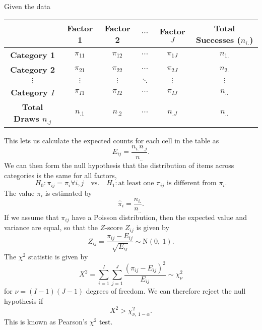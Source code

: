 \documentclass{article}
\begin{document}
Given the data
\begin{table}[H]
    \centering
    \begin{tabular}{c c c c c c}
        \toprule
                                        & \textbf{Factor 1} & \textbf{Factor 2} & \(\cdots\) & \textbf{Factor \(J\)} & \textbf{Total Successes (\(n_{i.}\))} \\
        \midrule
        \textbf{Category 1}             & \(\pi_{11}\)      & \(\pi_{12}\)      & \(\cdots\) & \(\pi_{1J}\)          & \(n_{1.}\)                            \\
        \textbf{Category 2}             & \(\pi_{21}\)      & \(\pi_{22}\)      & \(\cdots\) & \(\pi_{2J}\)          & \(n_{2.}\)                            \\
        \(\vdots\)                      & \(\vdots\)        & \(\vdots\)        & \(\ddots\) & \(\vdots\)            & \(\vdots\)                            \\
        \textbf{Category \(I\)}         & \(\pi_{I1}\)      & \(\pi_{I2}\)      & \(\cdots\) & \(\pi_{IJ}\)          & \(n_{..}\)                            \\
        \textbf{Total Draws \(n_{.j}\)} & \(n_{.1}\)        & \(n_{.2}\)        & \(\cdots\) & \(n_{.J}\)            & \(n_{..}\)                            \\
        \bottomrule
    \end{tabular}
\end{table}
This lets us calculate the expected counts for each cell in the table as
\begin{equation*}
    E_{ij} = \frac{n_{i.} n_{.j}}{n_{..}}.
\end{equation*}
We can then form the null hypothesis that the distribution of items across categories is the same for all factors,
\begin{equation*}
    H_0: \pi_{ij} = \pi_{i} \forall i, j \quad \text{vs.} \quad H_1: \text{at least one \(\pi_{ij}\) is different from \(\pi_{i}\)}.
\end{equation*}
The value \(\pi_i\) is estimated by
\begin{equation*}
    \hat{\pi}_i = \frac{n_{i.}}{n_{..}}.
\end{equation*}
If we assume that \(\pi_{ij}\) have a Poisson distribution, then the expected value and variance are equal, so that
the \(Z\)-score \(Z_{ij}\) is given by
\begin{equation*}
    Z_{ij} = \frac{\pi_{ij} - E_{ij}}{\sqrt{E_{ij}}} \sim \mathrm{N}\left( 0,\: 1 \right).
\end{equation*}
The \(\chi^2\) statistic is given by
\begin{equation*}
    X^2 = \sum_{i = 1}^I \sum_{j = 1}^J \frac{\left( \pi_{ij} - E_{ij} \right)^2}{E_{ij}} \sim \chi_{\nu}^2
\end{equation*}
for \(\nu = \left( I - 1 \right)\left( J - 1 \right)\) degrees of freedom. We can therefore reject the null hypothesis if
\begin{equation*}
    X^2 > \chi_{\nu, \: 1 - \alpha}^2.
\end{equation*}
This is known as Pearson's \(\chi^2\) test.
\end{document}
